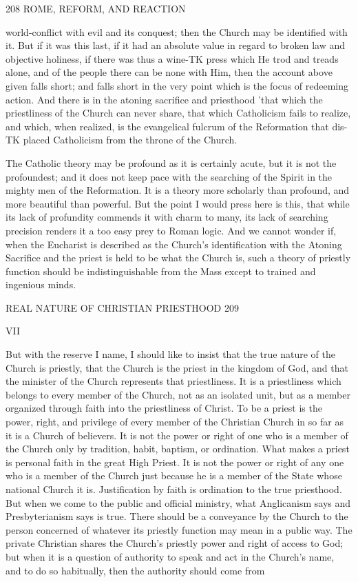 \documentclass[12pt,a5paper,oneside]{book}
\begin{document}
{{208 ROME, REFORM, AND REACTION 

world-conflict with evil and its conquest; then the 
Church may be identified with it. But if it was this 
last, if it had an absolute value in regard to broken 
law and objective holiness, if there was thus a wine-TK
press which He trod and treads alone, and of the 
people there can be none with Him, then the account 
above given falls short; and falls short in the very point 
which is the focus of redeeming action. And there is 
in the atoning sacrifice and priesthood 'that which the 
priestliness of the Church can never share, that which 
Catholicism fails to realize, and which, when realized, 
is the evangelical fulcrum of the Reformation that dis-TK
placed Catholicism from the throne of the Church. 

The Catholic theory may be profound as it is 
certainly acute, but it is not the profoundest; and it 
does not keep pace with the searching of the Spirit in 
the mighty men of the Reformation. It is a theory 
more scholarly than profound, and more beautiful than 
powerful. But the point I would press here is this, 
that while its lack of profundity commends it with 
charm to many, its lack of searching precision renders 
it a too easy prey to Roman logic. And we cannot 
wonder if, when the Eucharist is described as the 
Church's identification with the Atoning Sacrifice and 
the priest is held to be what the Church is, such a 
theory of priestly function should be indistinguishable 
from the Mass except to trained and ingenious minds. 



REAL NATURE OF CHRISTIAN PRIESTHOOD 209 

VII 

But with the reserve I name, I should like to insist 
that the true nature of the Church is priestly, that the 
Church is the priest in the kingdom of God, and that 
the minister of the Church represents that priestliness. 
It is a priestliness which belongs to every member of 
the Church, not as an isolated unit, but as a member 
organized through faith into the priestliness of Christ. 
To be a priest is the power, right, and privilege of 
every member of the Christian Church in so far as 
it is a Church of believers. It is not the power or 
right of one who is a member of the Church only by 
tradition, habit, baptism, or ordination. What makes 
a priest is personal faith in the great High Priest. 
It is not the power or right of any one who is a 
member of the Church just because he is a member 
of the State whose national Church it is. Justification 
by faith is ordination to the true priesthood. But 
when we come to the public and official ministry, 
what Anglicanism says and Presbyterianism says is 
true. There should be a conveyance by the Church 
to the person concerned of whatever its priestly 
function may mean in a public way. The private 
Christian shares the Church's priestly power and 
right of access to God; but when it is a question of 
authority to speak and act in the Church's name, and to 
do so habitually, then the authority should come from 

}}
\end{document}
